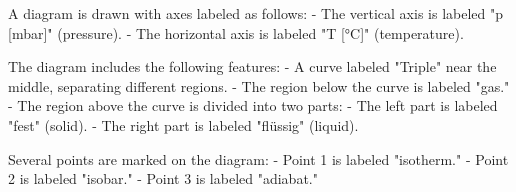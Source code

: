 A diagram is drawn with axes labeled as follows:  
- The vertical axis is labeled "p [mbar]" (pressure).  
- The horizontal axis is labeled "T [°C]" (temperature).  

The diagram includes the following features:  
- A curve labeled "Triple" near the middle, separating different regions.  
- The region below the curve is labeled "gas."  
- The region above the curve is divided into two parts:  
  - The left part is labeled "fest" (solid).  
  - The right part is labeled "flüssig" (liquid).  

Several points are marked on the diagram:  
- Point 1 is labeled "isotherm."  
- Point 2 is labeled "isobar."  
- Point 3 is labeled "adiabat."